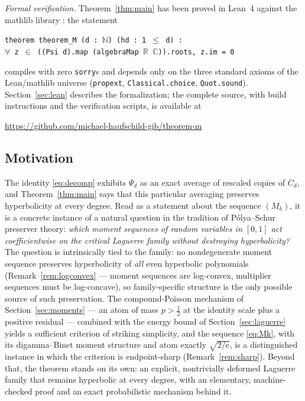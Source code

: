 \documentclass[11pt]{amsart}
\theoremstyle{definition}
\theoremstyle{remark}
\newcommand{\e}{\mathrm{e}}
\newcommand{\R}{\mathbb{R}}
\newcommand{\C}{\mathbb{C}}
\newcommand{\N}{\mathbb{N}}
\begin{document}
\emph{Formal verification.} Theorem~\ref{thm:main} has been proved in
Lean~4 \cite{lean4} against the mathlib library \cite{mathlib}: the
statement
\begin{center}
\texttt{theorem theorem\_M (d :\ $\N$) (hd :\ 1 $\le$ d) :\\
$\forall$ z $\in$ ((Psi d).map (algebraMap $\R$ $\C$)).roots, z.im = 0}
\end{center}
compiles with zero \texttt{sorry}s and depends only on the three
standard axioms of the Lean/mathlib universe
(\texttt{propext}, \texttt{Classical.choice}, \texttt{Quot.sound}).
Section~\ref{sec:lean} describes the formalization; the complete
source, with build instructions and the verification scripts, is
available at
\begin{center}
\url{https://github.com/michael-haufschild-gib/theorem-m}
\end{center}

\subsection*{Motivation}
The identity \eqref{eq:decomp} exhibits $\Psi_d$ as an exact average
of rescaled copies of $C_d$, and Theorem~\ref{thm:main} says that this
particular averaging preserves hyperbolicity at every degree. Read as
a statement about the sequence $(M_k)$, it is a concrete instance of a
natural question in the tradition of P\'olya--Schur preserver theory:
\emph{which moment sequences of random variables in $[0,1]$ act
coefficientwise on the critical Laguerre family without destroying
hyperbolicity?} The question is intrinsically tied to the family: no
nondegenerate moment sequence preserves hyperbolicity of \emph{all}
even hyperbolic polynomials (Remark~\ref{rem:logconvex} --- moment
sequences are log-convex, multiplier sequences must be log-concave),
so family-specific structure is the only possible source of such
preservation. The compound-Poisson mechanism of
Section~\ref{sec:moments} --- an atom of mass $p>\tfrac12$ at the
identity scale plus a positive residual --- combined with the energy
bound of Section~\ref{sec:laguerre} yields a sufficient criterion of
striking simplicity, and the sequence \eqref{eq:Mk}, with its
digamma--Binet moment structure and atom exactly $\sqrt{2/\e}$, is a
distinguished instance in which the criterion is endpoint-sharp
(Remark~\ref{rem:sharp}). Beyond that, the theorem stands on its own:
an explicit, nontrivially deformed Laguerre family that remains
hyperbolic at every degree, with an elementary, machine-checked proof
and an exact probabilistic mechanism behind it.
\end{document}
